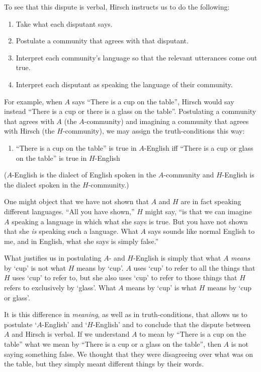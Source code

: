 \documentclass[11pt]{article}
\begin{document}
\begin{spacing}{1.25}
To see that this dispute is verbal, Hirsch instructs us to do the
following:

\begin{enumerate}
  \item Take what each disputant says.
  \item Postulate a community that agrees with that disputant.
  \item Interpret each community's language so that the relevant
    utterances come out true.
  \item Interpret each disputant as speaking the language of their
    community.
\end{enumerate}

For example, when $A$ says ``There is a cup on the table'', Hirsch
would say instead ``There is a cup or there is a glass on the table''.
Postulating a community that agrees with $A$ (the $A$-community) and
imagining a community that agrees with Hirsch (the $H$-community), we
may assign the truth-conditions this way:
\begin{enumerate}[itemindent=25pt, label=(T)]
    \item ``There is a cup on the table'' is true in $A$-English iff
    ``There is a cup or glass on the table'' is true in $H$-English
\end{enumerate}
($A$-English is the dialect of English spoken in the $A$-community and
$H$-English is the dialect spoken in the $H$-community.)

One might object that we have not shown that $A$ and $H$ are in fact
speaking different languages.  ``All you have shown,'' $H$ might say,
``is that we can imagine $A$ speaking a language in which what she
says is true.  But you have not shown that she {\em is} speaking such
a language.  What $A$ says sounds like normal English to me, and in
English, what she says is simply false.''

What justifies us in postulating $A$- and $H$-English is simply that
what $A$ {\em means} by `cup' is not what $H$ means by `cup'.  $A$
uses `cup' to refer to all the things that $H$ uses `cup' to refer to,
but she also uses `cup' to refer to those things that $H$ refers to
exclusively by `glass'.  What $A$ means by `cup' is what $H$ means by
`cup or glass'.

It is this difference in {\em meaning}, as well as in
truth-conditions, that allows us to postulate `$A$-English' and
`$H$-English' and to conclude that the dispute between $A$ and Hirsch
is verbal. If we understand $A$ to mean by ``There is a cup on the
table'' what we mean by ``There is a cup or a glass on the table'',
then $A$ is not saying something false.  We thought that they were
disagreeing over what was on the table, but they simply meant
different things by their words.


\end{spacing}
\end{document}
